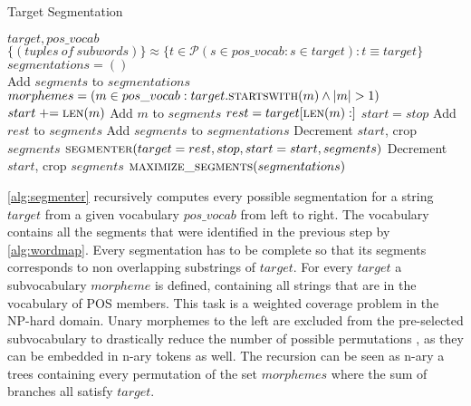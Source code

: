 \begin{algorithm}
    \caption{Target Segmentation}\label{alg:segmenter}
    \begin{algorithmic}[1]
        \Require $target,pos\_vocab$ 
        \Ensure $\{(tuples\:of\:subwords)\} \approx \{ t \in \mathcal{P} (s \in pos\_vocab : s \in target) : t \equiv target\}$
        \\
        \State $segmentations = ()$
        \\

            \State Add $segments$ to $segmentations$
        \Else
            \State $morphemes = (m \in pos\_vocab : target. \textsc{startswith}(m) \wedge |m|>1)$
                \State $start \mathrel{+}= \textsc{len}(m)$
                \State Add $m$ to $segments$
                \State $rest = target[\textsc{len}(m):]$
                    \State $start = stop$
                    \State Add $rest$ to $segments$
                    \State Add $segments$ to $segmentations$
                    \State Decrement $start$, crop $segments$
                \Else
                    \State $\textsc{segmenter}(target=rest, stop, start=start, segments)$
                    \State Decrement $start$, crop $segments$
                \EndIf
            \EndFor
        \EndIf
        \EndFunction
        \State $\textsc{maximize\_segments}(segmentations)$
    \end{algorithmic}
\end{algorithm}

\autoref{alg:segmenter} recursively computes every possible segmentation for a string $target$ from a given vocabulary $pos\_vocab$ from left to right.
The vocabulary contains all the segments that were identified in the previous step by \autoref{alg:wordmap}.
Every segmentation has to be complete so that its segments corresponds to non overlapping substrings of $target$.
For every $target$ a subvocabulary $morpheme$ is defined, containing all strings that are in the vocabulary of \ac{POS} \- members.
This task is a weighted coverage problem in the \uppercase{NP}-hard domain.
Unary morphemes to the left are excluded from the pre-selected subvocabulary to drastically reduce the number of possible permutations , as they can be embedded in n-ary tokens as well.
The recursion can be seen as n-ary a trees containing every permutation of the set $morphemes$ where the sum of branches all satisfy $target$.

